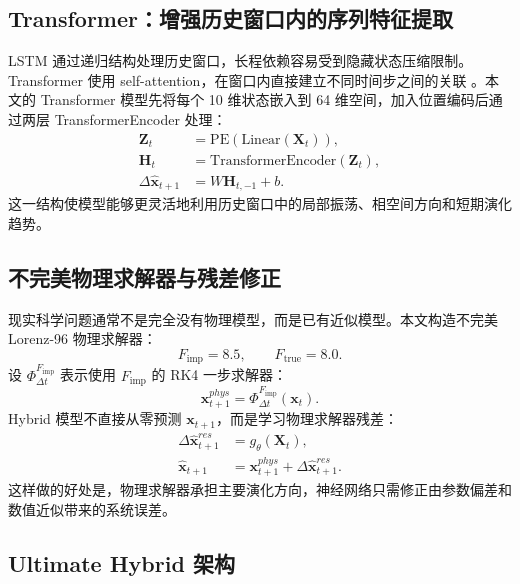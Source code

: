 \documentclass[UTF8,a4paper,12pt]{ctexart}
\newcommand{\xvec}{\mathbf{x}}
\newcommand{\dt}{\Delta t}
\begin{document}
\subsection{Transformer：增强历史窗口内的序列特征提取}

LSTM 通过递归结构处理历史窗口，长程依赖容易受到隐藏状态压缩限制。Transformer 使用 self-attention，在窗口内直接建立不同时间步之间的关联 \cite{vaswani2017}。本文的 Transformer 模型先将每个 10 维状态嵌入到 64 维空间，加入位置编码后通过两层 TransformerEncoder 处理：
\begin{align}
\mathbf{Z}_t &= \mathrm{PE}(\mathrm{Linear}(\mathbf{X}_t)),\\
\mathbf{H}_t &= \mathrm{TransformerEncoder}(\mathbf{Z}_t),\\
\Delta\hat{\xvec}_{t+1} &= W\mathbf{H}_{t,-1}+b.
\end{align}
这一结构使模型能够更灵活地利用历史窗口中的局部振荡、相空间方向和短期演化趋势。

\subsection{不完美物理求解器与残差修正}

现实科学问题通常不是完全没有物理模型，而是已有近似模型。本文构造不完美 Lorenz-96 物理求解器：
\begin{equation}
F_{\mathrm{imp}}=8.5,\qquad F_{\mathrm{true}}=8.0.
\end{equation}
设 $\Phi_{\dt}^{F_{\mathrm{imp}}}$ 表示使用 $F_{\mathrm{imp}}$ 的 RK4 一步求解器：
\begin{equation}
\xvec^{phys}_{t+1}=\Phi_{\dt}^{F_{\mathrm{imp}}}(\xvec_t).
\end{equation}
Hybrid 模型不直接从零预测 $\xvec_{t+1}$，而是学习物理求解器残差：
\begin{align}
\Delta \hat{\xvec}^{res}_{t+1} &= g_\theta(\mathbf{X}_t),\\
\hat{\xvec}_{t+1} &= \xvec^{phys}_{t+1}+\Delta \hat{\xvec}^{res}_{t+1}.
\end{align}
这样做的好处是，物理求解器承担主要演化方向，神经网络只需修正由参数偏差和数值近似带来的系统误差。

\subsection{Ultimate Hybrid 架构}
\end{document}
